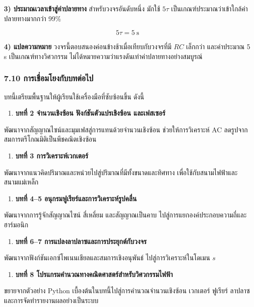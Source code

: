 \textbf{3) ประมาณเวลาเข้าสู่ค่าปลายทาง}
สำหรับวงจรอันดับหนึ่ง มักใช้ $5\tau$ เป็นเกณฑ์ประมาณว่าเข้าใกล้ค่าปลายทางมากกว่า 99\%

\[
5\tau=5\ \mathrm{s}
\]

\textbf{4) แปลความหมาย}
วงจรนี้ตอบสนองค่อนข้างช้าเมื่อเทียบกับวงจรที่มี $RC$ เล็กกว่า และค่าประมาณ 5 s เป็นเกณฑ์ทางวิศวกรรม ไม่ได้หมายความว่าแรงดันเท่าค่าปลายทางอย่างสมบูรณ์

 

\subsubsection{7.10 การเชื่อมโยงกับบทต่อไป}

บทนี้เตรียมพื้นฐานให้ผู้เรียนใช้เครื่องมือที่ซับซ้อนขึ้น ดังนี้

\begin{enumerate}
    \item \textbf{บทที่ 2 จำนวนเชิงซ้อน ฟังก์ชันตัวแปรเชิงซ้อน และเฟสเซอร์}  
\end{enumerate}
   พัฒนาจากสัญญาณไซน์และมุมเฟสสู่การแทนด้วยจำนวนเชิงซ้อน ช่วยให้การวิเคราะห์ AC ลดรูปจากสมการตรีโกณมิติเป็นพีชคณิตเชิงซ้อน

\begin{enumerate}
    \item \textbf{บทที่ 3 การวิเคราะห์เวกเตอร์}  
\end{enumerate}
   พัฒนาจากแนวคิดปริมาณและหน่วยไปสู่ปริมาณที่มีทั้งขนาดและทิศทาง เพื่อใช้กับสนามไฟฟ้าและสนามแม่เหล็ก

\begin{enumerate}
    \item \textbf{บทที่ 4–5 อนุกรมฟูเรียร์และการวิเคราะห์รูปคลื่น}  
\end{enumerate}
   พัฒนาจากการรู้จักสัญญาณไซน์ สี่เหลี่ยม และสัญญาณเป็นคาบ ไปสู่การแยกองค์ประกอบความถี่และฮาร์มอนิก

\begin{enumerate}
    \item \textbf{บทที่ 6–7 การแปลงลาปลาซและการประยุกต์กับวงจร}  
\end{enumerate}
   พัฒนาจากฟังก์ชันเอกซ์โพเนนเชียลและสมการเชิงอนุพันธ์ ไปสู่การวิเคราะห์ในโดเมน $s$

\begin{enumerate}
    \item \textbf{บทที่ 8 โปรแกรมคำนวณทางคณิตศาสตร์สำหรับวิศวกรรมไฟฟ้า}  
\end{enumerate}
   ขยายจากตัวอย่าง Python เบื้องต้นในบทนี้ไปสู่การคำนวณจำนวนเชิงซ้อน เวกเตอร์ ฟูเรียร์ ลาปลาซ และการจัดทำรายงานผลอย่างเป็นระบบ

